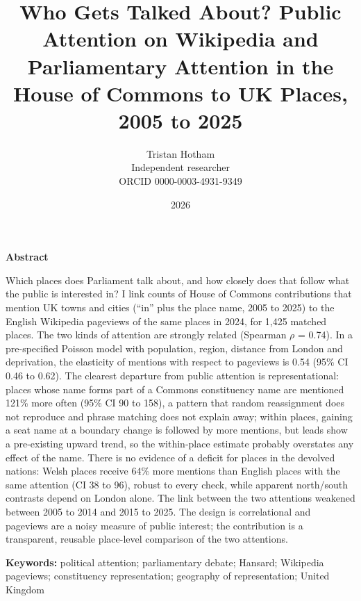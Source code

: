 \documentclass[11pt,a4paper]{article}
\title{\textbf{Who Gets Talked About? Public Attention on Wikipedia and Parliamentary Attention in the House of Commons to UK Places, 2005 to 2025}}
\author{Tristan Hotham\\\small Independent researcher\\\small ORCID 0000-0003-4931-9349}
\date{2026}
\begin{document}
\maketitle
\begin{center}\textbf{Abstract}\end{center}
Which places does Parliament talk about, and how closely does that follow what the public is interested in? I link counts of House of Commons contributions that mention UK towns and cities (``in'' plus the place name, 2005 to 2025) to the English Wikipedia pageviews of the same places in 2024, for 1,425 matched places. The two kinds of attention are strongly related (Spearman $\rho$ = 0.74). In a pre-specified Poisson model with population, region, distance from London and deprivation, the elasticity of mentions with respect to pageviews is 0.54 (95\% CI 0.46 to 0.62). The clearest departure from public attention is representational: places whose name forms part of a Commons constituency name are mentioned 121\% more often (95\% CI 90 to 158), a pattern that random reassignment does not reproduce and phrase matching does not explain away; within places, gaining a seat name at a boundary change is followed by more mentions, but leads show a pre-existing upward trend, so the within-place estimate probably overstates any effect of the name. There is no evidence of a deficit for places in the devolved nations: Welsh places receive 64\% more mentions than English places with the same attention (CI 38 to 96), robust to every check, while apparent north/south contrasts depend on London alone. The link between the two attentions weakened between 2005 to 2014 and 2015 to 2025. The design is correlational and pageviews are a noisy measure of public interest; the contribution is a transparent, reusable place-level comparison of the two attentions.

\medskip\noindent\textbf{Keywords:} political attention; parliamentary debate; Hansard; Wikipedia pageviews; constituency representation; geography of representation; United Kingdom
\end{document}
